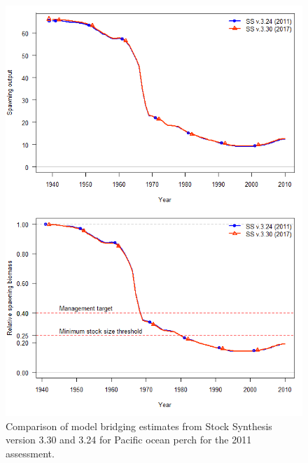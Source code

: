 \documentclass[12pt,]{article}
\begin{document}
\begin{figure}
\centering
\includegraphics{Figures/bridging.png}
\caption{Comparison of model bridging estimates from Stock Synthesis
version 3.30 and 3.24 for Pacific ocean perch for the 2011 assessment.
\label{fig:bridge}}
\end{figure}

\FloatBarrier 
\end{document}
